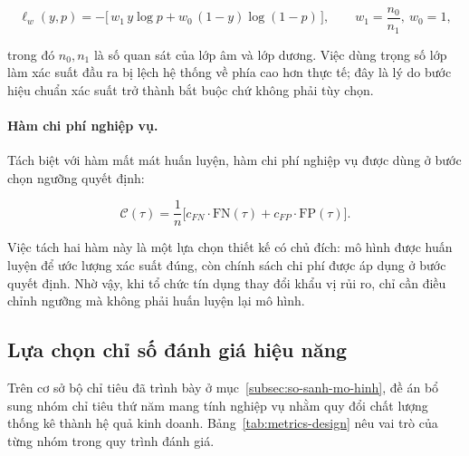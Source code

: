 \begin{equation}
\ell_w(y, p) = -\big[\, w_1 \, y \log p + w_0 \,(1 - y) \log (1 - p) \,\big],
\qquad
w_1 = \frac{n_0}{n_1},\ w_0 = 1,
\label{eq:weighted-logloss}
\end{equation}

trong đó $n_0, n_1$ là số quan sát của lớp âm và lớp dương. Việc dùng trọng số
lớp làm xác suất đầu ra bị lệch hệ thống về phía cao hơn thực tế; đây là lý do
bước hiệu chuẩn xác suất trở thành bắt buộc chứ không phải tùy chọn.

\paragraph{Hàm chi phí nghiệp vụ.} Tách biệt với hàm mất mát huấn luyện, hàm chi
phí nghiệp vụ được dùng ở bước chọn ngưỡng quyết định:

\begin{equation}
\mathcal{C}(\tau) = \frac{1}{n}\Big[ c_{FN} \cdot \text{FN}(\tau)
                                   + c_{FP} \cdot \text{FP}(\tau) \Big].
\label{eq:business-cost}
\end{equation}

Việc tách hai hàm này là một lựa chọn thiết kế có chủ đích: mô hình được huấn
luyện để ước lượng xác suất đúng, còn chính sách chi phí được áp dụng ở bước
quyết định. Nhờ vậy, khi tổ chức tín dụng thay đổi khẩu vị rủi ro, chỉ cần điều
chỉnh ngưỡng mà không phải huấn luyện lại mô hình.

\subsection{Lựa chọn chỉ số đánh giá hiệu năng}
\label{subsec:chi-so-danh-gia}

Trên cơ sở bộ chỉ tiêu đã trình bày ở mục~\ref{subsec:so-sanh-mo-hinh}, đề
án bổ sung nhóm chỉ tiêu thứ năm mang tính nghiệp vụ nhằm quy đổi chất lượng
thống kê thành hệ quả kinh doanh. Bảng~\ref{tab:metrics-design} nêu vai trò của
từng nhóm trong quy trình đánh giá.

